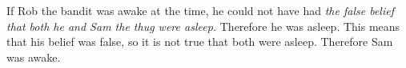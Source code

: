 \documentclass{article}
\begin{document}
\begin{soln} 
    If Rob the bandit was awake at the time, he could not have had \textit{the false belief
    that both he and Sam the thug were asleep.}
    Therefore he was asleep. This means that his belief was false,
    so it is not true that both were asleep.
    Therefore Sam was awake.
\end{soln}
\end{document}
